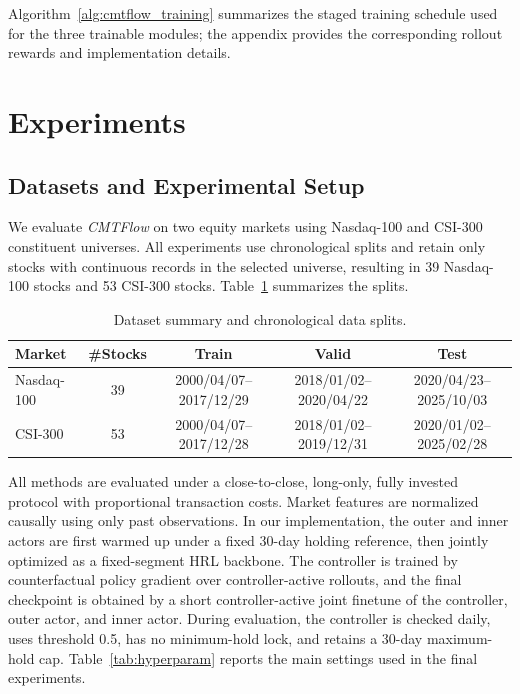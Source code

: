 \documentclass[letterpaper]{article} %
\begin{document}
Algorithm~\ref{alg:cmtflow_training} summarizes the staged training schedule used for the three trainable modules; the appendix provides the corresponding rollout rewards and implementation details.

\section{Experiments}
\subsection{Datasets and Experimental Setup}

We evaluate \textit{CMTFlow} on two equity markets using Nasdaq-100 and CSI-300 constituent universes. All experiments use chronological splits and retain only stocks with continuous records in the selected universe, resulting in 39 Nasdaq-100 stocks and 53 CSI-300 stocks. Table~\ref{tab:dataset} summarizes the splits.

\begin{table}[t]
\centering
\caption{Dataset summary and chronological data splits.}
\label{tab:dataset}
\small
\setlength{\tabcolsep}{5pt}
\renewcommand{\arraystretch}{1.08}
\begin{tabular}{@{}lcccc@{}}
\toprule
\textbf{Market} & \textbf{\#Stocks} & \textbf{Train} & \textbf{Valid} & \textbf{Test} \\
\midrule
Nasdaq-100 & 39 & 2000/04/07--2017/12/29 & 2018/01/02--2020/04/22 & 2020/04/23--2025/10/03 \\
CSI-300 & 53 & 2000/04/07--2017/12/28 & 2018/01/02--2019/12/31 & 2020/01/02--2025/02/28 \\
\bottomrule
\end{tabular}
\end{table}

All methods are evaluated under a close-to-close, long-only, fully invested protocol with proportional transaction costs. Market features are normalized causally using only past observations. In our implementation, the outer and inner actors are first warmed up under a fixed 30-day holding reference, then jointly optimized as a fixed-segment HRL backbone. The controller is trained by counterfactual policy gradient over controller-active rollouts, and the final checkpoint is obtained by a short controller-active joint finetune of the controller, outer actor, and inner actor. During evaluation, the controller is checked daily, uses threshold 0.5, has no minimum-hold lock, and retains a 30-day maximum-hold cap. Table~\ref{tab:hyperparam} reports the main settings used in the final experiments.
\end{document}

